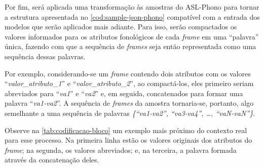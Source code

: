 
Por fim, será aplicada uma transformação às amostras do ASL-Phono para tornar a estrutura apresentada no \autoref{cod:sample-json-phono} compatível com a entrada dos modelos que serão aplicados mais adiante.
Para isso, serão compactados os valores informados para os atributos fonológicos de cada \textit{frame} em uma ``palavra'' única, fazendo com que a sequência de \textit{frames} seja então representada como uma sequência dessas palavras.

Por exemplo, considerando-se um \textit{frame} contendo dois atributos com os valores ``\textit{valor\_atributo\_1}'' e ``\textit{valor\_atributo\_2}'', ao compactá-los, eles primeiro seriam abreviados para ``\textit{va1}'' e ``\textit{va2}'' e, em seguida, concatenados para formar uma palavra ``\textit{va1-va2}''.  A sequência de \textit{frames} da amostra tornaria-se, portanto, algo semelhante a uma sequência de palavras \textit{\{``va1-va2'', ``va3-va4'', \dots, ``vaN-vaN''\}}.

Observe na \autoref{tab:codificacao-bloco} um exemplo mais próximo do contexto real para esse processo. Na primeira linha estão os valores originais dos atributos do \textit{frame}; na segunda, os valores abreviados; e, na terceira, a palavra formada através da concatenação deles.




